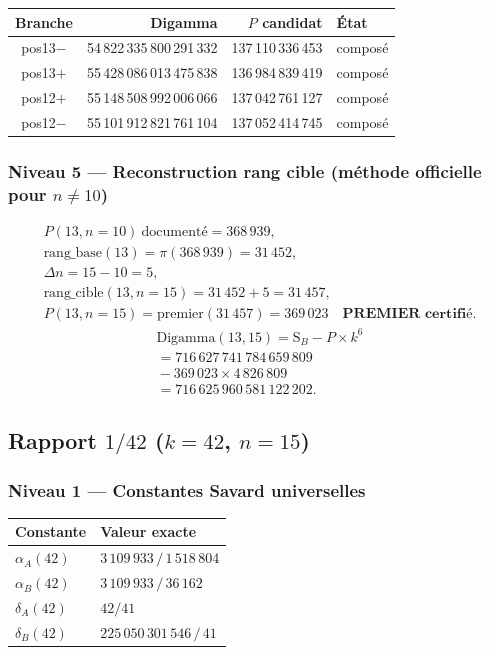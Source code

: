 \documentclass[11pt,a4paper]{article}
\newcommand{\SB}{\mathrm{S}_B}
\begin{document}
\begin{center}\small
\begin{tabular}{@{}c r r l@{}}
\toprule
\rowcolor{spectralgris}
Branche & Digamma & $P$ candidat & État \\
\midrule
pos13$-$ & 54\,822\,335\,800\,291\,332 & 137\,110\,336\,453 & composé \\
pos13$+$ & 55\,428\,086\,013\,475\,838 & 136\,984\,839\,419 & composé \\
pos12$+$ & 55\,148\,508\,992\,006\,066 & 137\,042\,761\,127 & composé \\
pos12$-$ & 55\,101\,912\,821\,761\,104 & 137\,052\,414\,745 & composé \\
\bottomrule
\end{tabular}
\end{center}

\subsubsection{Niveau 5 --- Reconstruction rang cible (méthode officielle pour $n \neq 10$)}
\begin{gather*}
P(13,n{=}10)\ \text{documenté}=368\,939,\\
\text{rang\_base}(13)=\pi(368\,939)=31\,452,\\
\Delta n=15-10=5,\\
\text{rang\_cible}(13,n{=}15)=31\,452+5=31\,457,\\
P(13,n{=}15)=\text{premier}(31\,457)=369\,023
\quad\textbf{PREMIER certifié}.
\end{gather*}
\begin{multline*}
\text{Digamma}(13,15)=\SB-P\times k^{6}\\
=716\,627\,741\,784\,659\,809\\
{}-369\,023\times4\,826\,809\\
=716\,625\,960\,581\,122\,202.
\end{multline*}

\subsection{Rapport $1/42$ ($k = 42$, $n = 15$)}

\subsubsection{Niveau 1 --- Constantes Savard universelles}

\begin{center}\small
\begin{tabular}{@{}l l@{}}
\toprule
\rowcolor{spectralgris}
Constante & Valeur exacte \\
\midrule
$\alpha_A(42)$ & $3\,109\,933\,/\,1\,518\,804$ \\
$\alpha_B(42)$ & $3\,109\,933\,/\,36\,162$ \\
$\delta_A(42)$ & $42/41$ \\
$\delta_B(42)$ & $225\,050\,301\,546\,/\,41$ \\
\bottomrule
\end{tabular}
\end{center}
\end{document}
